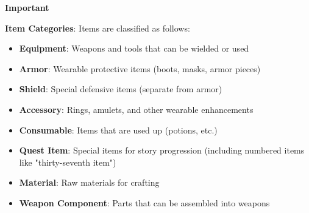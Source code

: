 \documentclass[11pt,letterpaper,oldstylefigures]{memoir}
\newenvironment{Important}
{\begingroup
\small
\setlength{\parindent}{0pt}
\setlength{\parskip}{0.5em}
\allowdisplaybreaks
\setlength{\displaywidowpenalty}{0}
\setlength{\widowpenalty}{0}
\setlength{\clubpenalty}{0}
\setlength{\interlinepenalty}{0}
\begin{tcolorbox}[
    colback=yellow!5,
    colframe=yellow!75!black,
    boxrule=0.5pt,
    arc=2pt,
    left=0.5em,
    right=0.5em,
    top=0.25em,
    bottom=0.25em
]
\textbf{Important}
\end{tcolorbox}\par
}
{\endgroup}
\begin{document}
\begin{Important}
\textbf{Item Categories}: Items are classified as follows:
\begin{itemize}
\item \textbf{Equipment}: Weapons and tools that can be wielded or used
\item \textbf{Armor}: Wearable protective items (boots, masks, armor pieces)
\item \textbf{Shield}: Special defensive items (separate from armor)
\item \textbf{Accessory}: Rings, amulets, and other wearable enhancements
\item \textbf{Consumable}: Items that are used up (potions, etc.)
\item \textbf{Quest Item}: Special items for story progression (including numbered items like "thirty-seventh item")
\item \textbf{Material}: Raw materials for crafting
\item \textbf{Weapon Component}: Parts that can be assembled into weapons
\end{itemize}
\end{Important}
\end{document}
